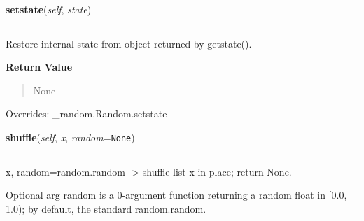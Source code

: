     \vspace{0.5ex}

\hspace{.8\funcindent}\begin{boxedminipage}{\funcwidth}

    \raggedright \textbf{setstate}(\textit{self}, \textit{state})

    \vspace{-1.5ex}

    \rule{\textwidth}{0.5\fboxrule}
\setlength{\parskip}{2ex}
    Restore internal state from object returned by getstate().

\setlength{\parskip}{1ex}
      \textbf{Return Value}
    \vspace{-1ex}

      \begin{quote}
      None

      \end{quote}

      Overrides: \_random.Random.setstate

    \end{boxedminipage}

    \label{random:Random:shuffle}

    \vspace{0.5ex}

\hspace{.8\funcindent}\begin{boxedminipage}{\funcwidth}

    \raggedright \textbf{shuffle}(\textit{self}, \textit{x}, \textit{random}={\tt None})

    \vspace{-1.5ex}

    \rule{\textwidth}{0.5\fboxrule}
\setlength{\parskip}{2ex}
    x, random=random.random -{\textgreater} shuffle list x in place; return
    None.

    Optional arg random is a 0-argument function returning a random float 
    in [0.0, 1.0); by default, the standard random.random.

\setlength{\parskip}{1ex}
    \end{boxedminipage}

    \label{random:Random:triangular}

    \vspace{0.5ex}

